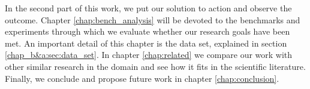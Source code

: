 In the second part of this work, we put our solution to action and observe the outcome. Chapter
\ref{chap:bench_analysis} will be devoted to the benchmarks and experiments through which we
evaluate whether our research goals have been met. An important detail of this chapter is the data
set, explained in section \ref{chap_b&a:sec:data_set}. In chapter \ref{chap:related} we compare our
work with other similar research in the domain and see how it fits in the scientific literature.
Finally, we conclude and propose future work in chapter \ref{chap:conclusion}.

